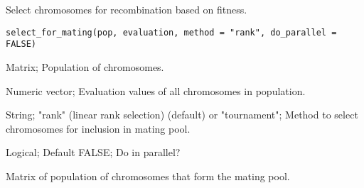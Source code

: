 %
\begin{Description}\relax
Select chromosomes for recombination based on fitness.
\end{Description}
%
\begin{Usage}
\begin{verbatim}
select_for_mating(pop, evaluation, method = "rank", do_parallel = FALSE)
\end{verbatim}
\end{Usage}
%
\begin{Arguments}
\begin{ldescription}
\item[\code{pop}] Matrix; Population of chromosomes.

\item[\code{evaluation}] Numeric vector; Evaluation values of all chromosomes in population.

\item[\code{method}] String; "rank" (linear rank selection) (default) or
"tournament"; Method to select chromosomes for inclusion in mating pool.

\item[\code{do\_parallel}] Logical; Default FALSE; Do in parallel?
\end{ldescription}
\end{Arguments}
%
\begin{Value}
Matrix of population of chromosomes that form the mating pool.
\end{Value}
